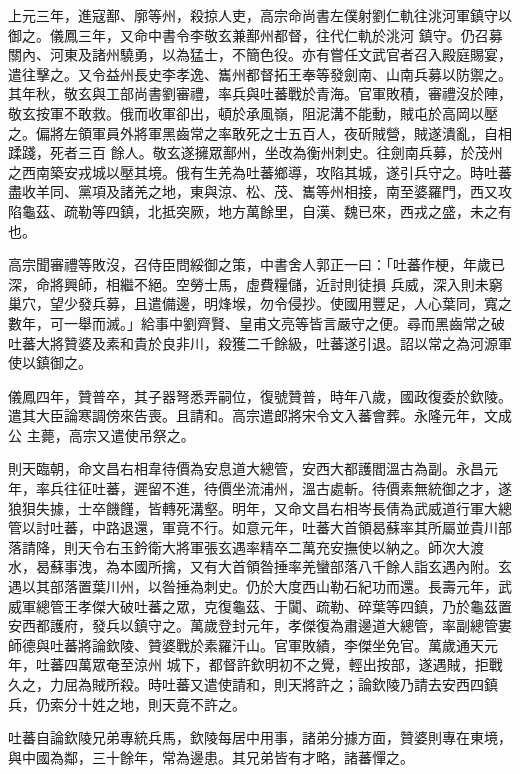 \begin{pinyinscope}
 上元三年，進寇鄯、廓等州，殺掠人吏，高宗命尚書左僕射劉仁軌往洮河軍鎮守以御之。儀鳳三年，又命中書令李敬玄兼鄯州都督，往代仁軌於洮河
 鎮守。仍召募關內、河東及諸州驍勇，以為猛士，不簡色役。亦有嘗任文武官者召入殿庭賜宴，遣往擊之。又令益州長史李孝逸、巂州都督拓王奉等發劍南、山南兵募以防禦之。其年秋，敬玄與工部尚書劉審禮，率兵與吐蕃戰於青海。官軍敗積，審禮沒於陣，敬玄按軍不敢救。俄而收軍卻出，頓於承風嶺，阻泥溝不能動，賊屯於高岡以壓之。偏將左領軍員外將軍黑齒常之率敢死之士五百人，夜斫賊營，賊遂潰亂，自相蹂踐，死者三百
 餘人。敬玄遂擁眾鄯州，坐改為衡州刺史。往劍南兵募，於茂州之西南築安戎城以壓其境。俄有生羌為吐蕃鄉導，攻陷其城，遂引兵守之。時吐蕃盡收羊同、黨項及諸羌之地，東與涼、松、茂、巂等州相接，南至婆羅門，西又攻陷龜茲、疏勒等四鎮，北抵突厥，地方萬餘里，自漢、魏已來，西戎之盛，未之有也。



 高宗聞審禮等敗沒，召侍臣問綏御之策，中書舍人郭正一曰：「吐蕃作梗，年歲已深，命將興師，相繼不絕。空勞士馬，虛費糧儲，近討則徒損
 兵威，深入則未窮巢穴，望少發兵募，且遣備邊，明烽堠，勿令侵抄。使國用豐足，人心葉同，寬之數年，可一舉而滅。」給事中劉齊賢、皇甫文亮等皆言嚴守之便。尋而黑齒常之破吐蕃大將贊婆及素和貴於良非川，殺獲二千餘級，吐蕃遂引退。詔以常之為河源軍使以鎮御之。



 儀鳳四年，贊普卒，其子器弩悉弄嗣位，復號贊普，時年八歲，國政復委於欽陵。遣其大臣論寒調傍來告喪。且請和。高宗遣郎將宋令文入蕃會葬。永隆元年，文成公
 主薨，高宗又遣使吊祭之。



 則天臨朝，命文昌右相韋待價為安息道大總管，安西大都護閻溫古為副。永昌元年，率兵往征吐蕃，遲留不進，待價坐流浦州，溫古處斬。待價素無統御之才，遂狼狽失據，士卒饑饉，皆轉死溝壑。明年，又命文昌右相岑長倩為武威道行軍大總管以討吐蕃，中路退還，軍竟不行。如意元年，吐蕃大首領曷蘇率其所屬並貴川部落請降，則天令右玉鈐衛大將軍張玄遇率精卒二萬充安撫使以納之。師次大渡
 水，曷蘇事洩，為本國所擒，又有大首領昝捶率羌蠻部落八千餘人詣玄遇內附。玄遇以其部落置葉川州，以昝捶為刺史。仍於大度西山勒石紀功而還。長壽元年，武威軍總管王孝傑大破吐蕃之眾，克復龜茲、于闐、疏勒、碎葉等四鎮，乃於龜茲置安西都護府，發兵以鎮守之。萬歲登封元年，孝傑復為肅邊道大總管，率副總管婁師德與吐蕃將論欽陵、贊婆戰於素羅汗山。官軍敗績，李傑坐免官。萬歲通天元年，吐蕃四萬眾奄至涼州
 城下，都督許欽明初不之覺，輕出按部，遂遇賊，拒戰久之，力屈為賊所殺。時吐蕃又遣使請和，則天將許之；論欽陵乃請去安西四鎮兵，仍索分十姓之地，則天竟不許之。



 吐蕃自論欽陵兄弟專統兵馬，欽陵每居中用事，諸弟分據方面，贊婆則專在東境，與中國為鄰，三十餘年，常為邊患。其兄弟皆有才略，諸蕃憚之。




\end{pinyinscope}
